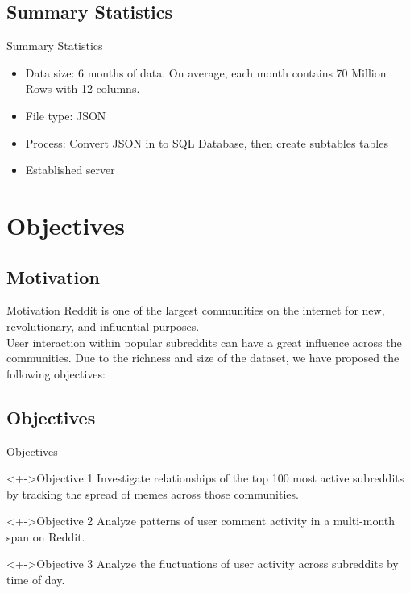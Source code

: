\documentclass{beamer}
\begin{document}
\subsection{Summary Statistics} %
\begin{frame}{Summary Statistics}
\begin{itemize}
	\item Data size: 6 months of data. On average, each month contains 70 Million Rows with 12 columns. 
	\item File type: JSON
	\item Process: Convert JSON in to SQL Database, then create subtables tables
	\item Established server
\end{itemize}
\end{frame}

\section{Objectives}

\subsection{Motivation} %
\begin{frame}{Motivation}
Reddit is one of the largest communities on the internet for new, revolutionary, and influential purposes. \\ User interaction within popular subreddits can have a great influence across the communities. Due to the richness and size of the dataset, we have proposed the following objectives:
\end{frame}




\subsection{Objectives}

\begin{frame}{Objectives}

\begin{block}<+->{Objective 1} 
Investigate relationships of the top 100 most active subreddits by tracking the spread of memes across those communities.
\end{block}

\begin{block}<+->{Objective 2} 
Analyze patterns of user comment activity in a multi-month span on Reddit.
\end{block}

\begin{block}<+->{Objective 3}
Analyze the fluctuations of user activity across subreddits by time of day.
\end{block}
\end{frame}
\end{document}
